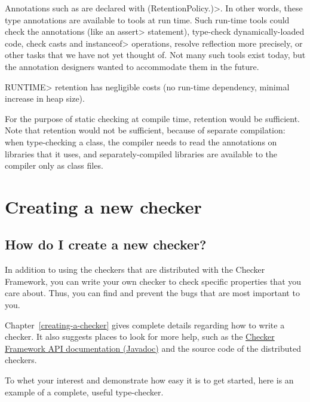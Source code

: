 Annotations such as  are
declared with
\<(RetentionPolicy.)>.  In other words,
these type annotations are available to tools at run time.  Such run-time
tools could check the annotations (like an \<assert> statement), type-check
dynamically-loaded code, check casts and \<instanceof> operations, resolve
reflection more precisely, or other tasks that we have not yet thought of.
Not many such tools exist today, but the annotation designers wanted to
accommodate them in the future.

\<RUNTIME> retention has negligible costs (no run-time dependency, minimal
increase in heap size).

For the purpose of static checking at compile time,
retention would be sufficient.  Note that
retention would not be sufficient, because of separate compilation: when
type-checking a class, the compiler needs to read the annotations on
libraries that it uses, and separately-compiled libraries are available to
the compiler only as class files.


\section{Creating a new checker\label{faq-create-a-checker-section}}

\subsection{How do I create a new checker?\label{faq-create-a-checker}}

In addition to using the checkers that are distributed with the Checker
Framework, you can write your own checker to check specific properties that
you care about.  Thus, you can find and prevent the bugs that are most
important to you.

Chapter~\ref{creating-a-checker} gives
complete details regarding how to write a checker.  It also suggests places
to look for more help, such as the \href{../api/}{Checker Framework
API documentation (Javadoc)} and the source code of the distributed
checkers.

To whet your interest and demonstrate how easy it is to get started, here
is an example of a complete, useful type-checker.

